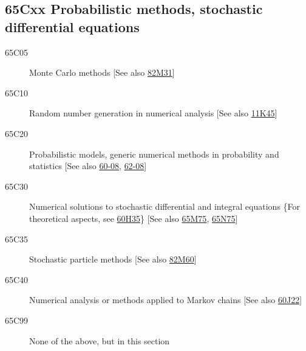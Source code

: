 \subsection*{65Cxx  Probabilistic methods, stochastic differential equations }\label{65Cxx}
\begin{description}  
\item [65C05]\label{65C05} Monte Carlo methods [See also \hyperref[82M31]{82M31}]
\item [65C10]\label{65C10} Random number generation in numerical analysis [See also \hyperref[11K45]{11K45}]
\item [65C20]\label{65C20} Probabilistic models, generic numerical methods in probability and statistics [See also \hyperref[60-08]{60-08}, \hyperref[62-08]{62-08}]
\item [65C30]\label{65C30} Numerical solutions to stochastic differential and integral equations \{For theoretical aspects, see \hyperref[60H35]{60H35}\} [See also \hyperref[65M75]{65M75}, \hyperref[65N75]{65N75}]
\item [65C35]\label{65C35} Stochastic particle methods [See also \hyperref[82M60]{82M60}]
\item [65C40]\label{65C40} Numerical analysis or methods applied to Markov chains [See also \hyperref[60J22]{60J22}]
\item [65C99]\label{65C99} None of the above, but in this section
\end{description}
